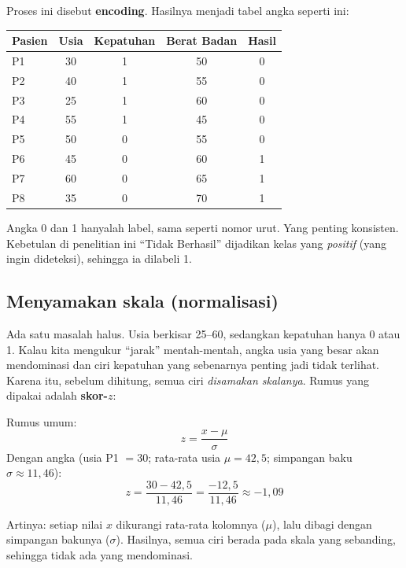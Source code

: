 \documentclass[11pt,a4paper]{article}
\begin{document}
Proses ini disebut \textbf{encoding}. Hasilnya menjadi tabel angka seperti ini:

\begin{center}
\begin{tabular}{lcccc}
\toprule
\textbf{Pasien} & \textbf{Usia} & \textbf{Kepatuhan} & \textbf{Berat Badan} & \textbf{Hasil} \\
\midrule
P1 & 30 & 1 & 50 & 0 \\
P2 & 40 & 1 & 55 & 0 \\
P3 & 25 & 1 & 60 & 0 \\
P4 & 55 & 1 & 45 & 0 \\
P5 & 50 & 0 & 55 & 0 \\
P6 & 45 & 0 & 60 & 1 \\
P7 & 60 & 0 & 65 & 1 \\
P8 & 35 & 0 & 70 & 1 \\
\bottomrule
\end{tabular}
\end{center}

\begin{catatan}[Mengapa Berhasil = 0 dan Tidak Berhasil = 1?]
Angka 0 dan 1 hanyalah label, sama seperti nomor urut. Yang penting konsisten. Kebetulan di
penelitian ini ``Tidak Berhasil'' dijadikan kelas yang \emph{positif} (yang ingin dideteksi),
sehingga ia dilabeli 1.
\end{catatan}

\subsection{Menya\-makan skala (normalisasi)}

Ada satu masalah halus. Usia berkisar 25--60, sedangkan kepatuhan hanya 0 atau 1. Kalau kita
mengukur ``jarak'' mentah-mentah, angka usia yang besar akan mendominasi dan ciri kepatuhan
yang sebenarnya penting jadi tidak terlihat. Karena itu, sebelum dihitung, semua ciri
\emph{disamakan skalanya}. Rumus yang dipakai adalah \textbf{skor-$z$}:

\begin{rumus}
Rumus umum:
\[ z = \frac{x - \mu}{\sigma} \]
Dengan angka (usia P1 $= 30$; rata-rata usia $\mu = 42{,}5$; simpangan baku $\sigma \approx 11{,}46$):
\[ z = \frac{30 - 42{,}5}{11{,}46} = \frac{-12{,}5}{11{,}46} \approx -1{,}09 \]
\end{rumus}

\noindent Artinya: setiap nilai $x$ dikurangi rata-rata kolomnya ($\mu$), lalu dibagi dengan
simpangan bakunya ($\sigma$). Hasilnya, semua ciri berada pada skala yang sebanding, sehingga
tidak ada yang mendominasi.
\end{document}
